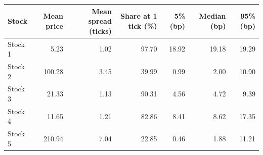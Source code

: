 \begin{tabular}{lrrrrrr}
\toprule
Stock & Mean price & Mean spread (ticks) & Share at 1 tick (\%) & 5\% (bp) & Median (bp) & 95\% (bp) \\
\midrule
Stock 1 & 5.23 & 1.02 & 97.70 & 18.92 & 19.18 & 19.29 \\
Stock 2 & 100.28 & 3.45 & 39.99 & 0.99 & 2.00 & 10.90 \\
Stock 3 & 21.33 & 1.13 & 90.31 & 4.56 & 4.72 & 9.39 \\
Stock 4 & 11.65 & 1.21 & 82.86 & 8.41 & 8.62 & 17.35 \\
Stock 5 & 210.94 & 7.04 & 22.85 & 0.46 & 1.88 & 11.21 \\
\bottomrule
\end{tabular}
